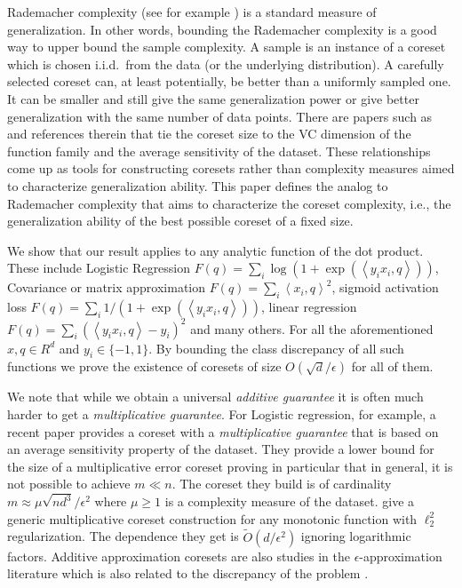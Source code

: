 \documentclass[12pt]{colt2019} %
\newcommand{\ip}[1]{\left \langle #1 \right \rangle}
\newcommand{\eps}{\epsilon}
\begin{document}
Rademacher complexity (see for example \cite{Bartlett:2003:RGC:944919.944944}) is a standard measure of generalization.
In other words, bounding the Rademacher complexity is a good way to upper bound the sample complexity. 
A sample is an instance of a coreset which is chosen i.i.d.\ from the data (or the underlying distribution).
A carefully selected coreset can, at least potentially, be better than a uniformly sampled one. 
It can be smaller and still give the same generalization power or give better generalization with the same number of data points. 
There are papers such as \cite{langberg2010universal, tolochinsky2018coresets} and references therein that tie the coreset size to the VC dimension of the function family and the average sensitivity of the dataset. 
These relationships come up as tools for constructing coresets rather than complexity measures aimed to characterize generalization ability. 
This paper defines the analog to Rademacher complexity that aims to characterize the coreset complexity, i.e., the generalization ability of the best possible coreset of a fixed size.
 
We show that our result applies to any analytic function of the dot product. 
These include Logistic Regression $F(q) =  \sum_i \log(1+\exp(\ip{y_ix_i,q}))$, Covariance or matrix approximation 
$F(q) =  \sum_i \ip{x_i,q}^2$, sigmoid activation loss $F(q) =  \sum_i 1/(1+\exp(\ip{y_ix_i,q}))$, linear regression $F(q) =  \sum_i (\ip{y_ix_i,q} -y_i)^2$ and many others. 
For all the aforementioned  $x,q \in R^d$ and $y_i \in \{-1,1\}$.
By bounding the class discrepancy of all such functions we prove the existence of coresets of size $O(\sqrt{d}/\eps)$ for all of them.

We note that while we obtain a universal {\it additive guarantee} it is often much harder to get a  {\it multiplicative guarantee}.
For Logistic regression, for example, a recent paper \cite{DBLP:journals/corr/abs-1805-08571} provides a coreset with a  {\it multiplicative guarantee} that is based on an average sensitivity property of the dataset. 
They provide a lower bound for the size of a multiplicative error coreset proving in particular that in general, it is not possible to achieve $m \ll n$. 
The coreset they build is of cardinality $m \approx \mu\sqrt{nd^3}/\eps^2$ where $\mu \geq 1$ is a complexity measure of the dataset.  
\cite{tolochinsky2018coresets} give a generic multiplicative coreset construction for any monotonic function with $\ell_2^2$ regularization. 
The dependence they get is $\tilde O(d/\eps^2)$ ignoring logarithmic factors. 
Additive approximation coresets are also studies in the $\eps$-approximation literature which is also related to the discrepancy of the problem \cite{DBLP:journals/corr/MustafaV17}.
\end{document}
